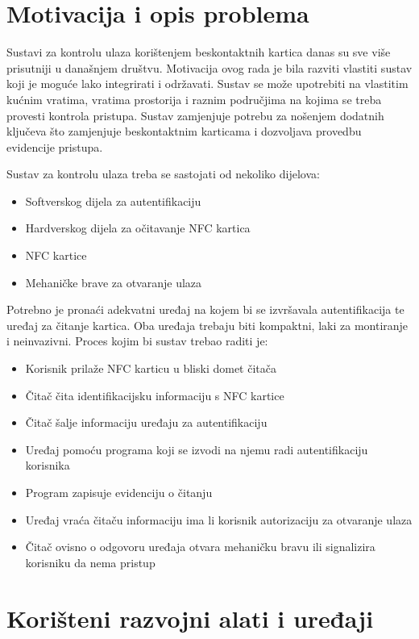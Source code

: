 \documentclass[times, utf8, zavrsni]{fer}
\begin{document}
\section{Motivacija i opis problema}
Sustavi za kontrolu ulaza korištenjem beskontaktnih kartica danas su sve više prisutniji u današnjem društvu. Motivacija ovog rada je bila razviti vlastiti sustav koji je moguće lako integrirati i održavati. Sustav se može upotrebiti na vlastitim kućnim vratima, vratima prostorija i raznim područjima na kojima se treba provesti kontrola pristupa. Sustav zamjenjuje potrebu za nošenjem dodatnih ključeva što zamjenjuje beskontaktnim karticama i dozvoljava provedbu evidencije pristupa.  \par
Sustav za kontrolu ulaza treba se sastojati od nekoliko dijelova:

\begin{itemize}
\item Softverskog dijela za autentifikaciju
\item Hardverskog dijela za očitavanje NFC kartica
\item NFC kartice 
\item Mehaničke brave za otvaranje ulaza
\end{itemize}
Potrebno je pronaći adekvatni uređaj na kojem bi se izvršavala autentifikacija te uređaj za čitanje kartica. Oba uređaja trebaju biti kompaktni, laki za montiranje i neinvazivni.
\newline
Proces kojim bi sustav trebao raditi je:

\begin{itemize}
\item Korisnik prilaže NFC karticu u bliski domet čitača
\item Čitač čita identifikacijsku informaciju s NFC kartice
\item Čitač šalje informaciju uređaju za autentifikaciju
\item Uređaj pomoću programa koji se izvodi na njemu radi autentifikaciju korisnika
\item Program zapisuje evidenciju o čitanju
\item Uređaj vraća čitaču informaciju ima li korisnik autorizaciju za otvaranje ulaza
\item Čitač ovisno o odgovoru uređaja otvara mehaničku bravu ili signalizira korisniku da nema pristup
\end{itemize}

\section{Korišteni razvojni alati i uređaji}
\end{document}
